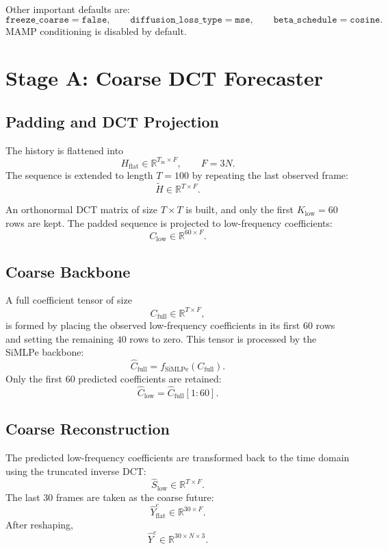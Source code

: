 \documentclass[11pt]{article}
\begin{document}
Other important defaults are:
\[
\texttt{freeze\_coarse} = \texttt{false},
\qquad
\texttt{diffusion\_loss\_type} = \texttt{mse},
\qquad
\texttt{beta\_schedule} = \texttt{cosine}.
\]
MAMP conditioning is disabled by default.

\section{Stage A: Coarse DCT Forecaster}

\subsection{Padding and DCT Projection}

The history is flattened into
\[
H_{\mathrm{flat}} \in \mathbb{R}^{T_{\mathrm{in}} \times F},
\qquad
F = 3N.
\]
The sequence is extended to length $T = 100$ by repeating the last observed frame:
\[
\tilde{H} \in \mathbb{R}^{T \times F}.
\]

An orthonormal DCT matrix of size $T \times T$ is built, and only the first $K_{\mathrm{low}} = 60$ rows are kept. The padded sequence is projected to low-frequency coefficients:
\[
C_{\mathrm{low}} \in \mathbb{R}^{60 \times F}.
\]

\subsection{Coarse Backbone}

A full coefficient tensor of size
\[
C_{\mathrm{full}} \in \mathbb{R}^{T \times F},
\]
is formed by placing the observed low-frequency coefficients in its first $60$ rows and setting the remaining $40$ rows to zero. This tensor is processed by the SiMLPe backbone:
\[
\hat{C}_{\mathrm{full}} = f_{\mathrm{SiMLPe}}(C_{\mathrm{full}}).
\]
Only the first $60$ predicted coefficients are retained:
\[
\hat{C}_{\mathrm{low}} = \hat{C}_{\mathrm{full}}[1{:}60].
\]

\subsection{Coarse Reconstruction}

The predicted low-frequency coefficients are transformed back to the time domain using the truncated inverse DCT:
\[
\hat{S}_{\mathrm{low}} \in \mathbb{R}^{T \times F}.
\]
The last $30$ frames are taken as the coarse future:
\[
\hat{Y}^{c}_{\mathrm{flat}} \in \mathbb{R}^{30 \times F}.
\]
After reshaping,
\[
\hat{Y}^{c} \in \mathbb{R}^{30 \times N \times 3}.
\]
\end{document}
